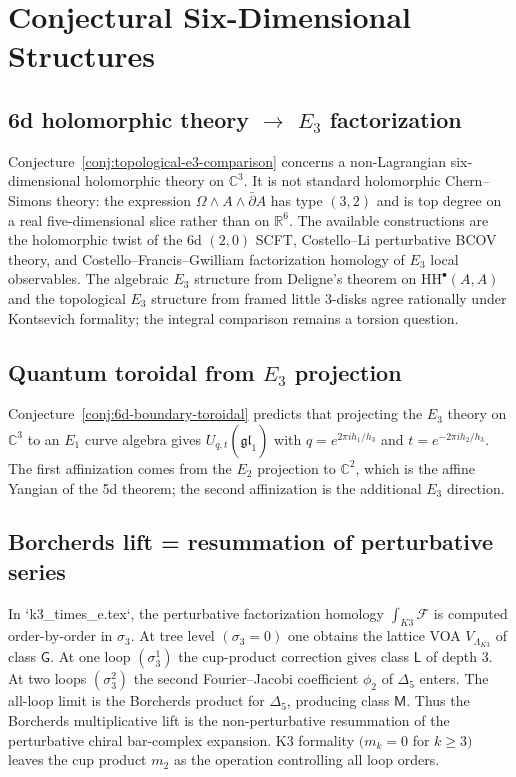 \documentclass[11pt]{article}
\newcommand{\fgl}{\mathfrak{gl}}
\newcommand{\HH}{\mathrm{HH}}
\newcommand{\C}{\mathbb{C}}
\newcommand{\R}{\mathbb{R}}
\theoremstyle{plain}
\theoremstyle{definition}
\theoremstyle{remark}
\begin{document}
\section{Conjectural Six-Dimensional Structures}

\subsection{6d holomorphic theory $\to$ $E_3$ factorization}

Conjecture~\ref{conj:topological-e3-comparison} concerns a
non-Lagrangian six-dimensional holomorphic theory on $\C^3$. It is
not standard holomorphic Chern--Simons theory: the expression
$\Omega\wedge A\wedge\bar\partial A$ has type $(3,2)$ and is top
degree on a real five-dimensional slice rather than on $\R^6$.
The available constructions are the holomorphic twist of the 6d
$(2,0)$ SCFT, Costello--Li perturbative BCOV theory, and
Costello--Francis--Gwilliam factorization homology of $E_3$ local
observables. The algebraic $E_3$ structure from Deligne's theorem on
$\HH^\bullet(A,A)$ and the topological $E_3$ structure from framed
little $3$-disks agree rationally under Kontsevich formality; the
integral comparison remains a torsion question.

\subsection{Quantum toroidal from $E_3$ projection}

Conjecture~\ref{conj:6d-boundary-toroidal} predicts that projecting the
$E_3$ theory on $\C^3$ to an $E_1$ curve algebra gives
$U_{q,t}(\widehat{\widehat{\fgl}}_1)$ with
$q=e^{2\pi i h_1/h_3}$ and $t=e^{-2\pi i h_2/h_3}$. The first
affinization comes from the $E_2$ projection to $\C^2$, which is the
affine Yangian of the 5d theorem; the second affinization is the
additional $E_3$ direction.

\subsection{Borcherds lift = resummation of perturbative series}

In `k3_times_e.tex`, the perturbative factorization homology
$\int_{K3}\mathcal F$ is computed order-by-order in $\sigma_3$. At tree
level $(\sigma_3=0)$ one obtains the lattice VOA
$V_{\Lambda_{K3}}$ of class $\mathsf{G}$. At one loop
$(\sigma_3^1)$ the cup-product correction gives class $\mathsf{L}$ of
depth $3$. At two loops $(\sigma_3^2)$ the second Fourier--Jacobi
coefficient $\phi_2$ of $\Delta_5$ enters. The all-loop limit is the
Borcherds product for $\Delta_5$, producing class $\mathsf{M}$. Thus
the Borcherds multiplicative lift is the non-perturbative resummation
of the perturbative chiral bar-complex expansion. K3 formality
$(m_k=0$ for $k\geq3)$ leaves the cup product $m_2$ as the operation
controlling all loop orders.
\end{document}
